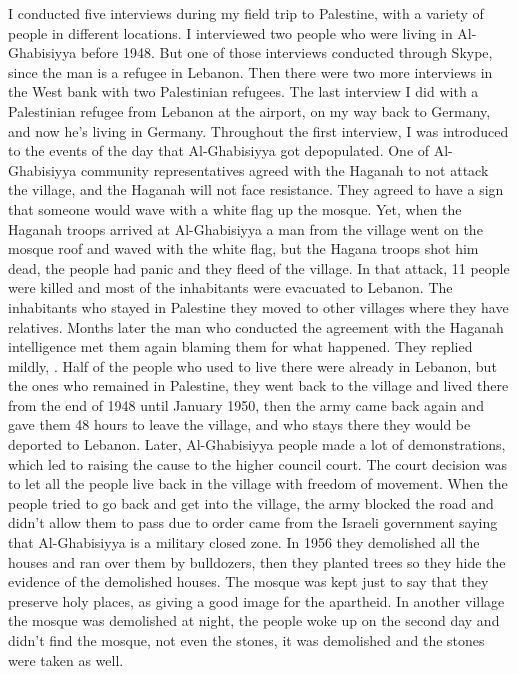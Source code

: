 I conducted five interviews during my field trip to Palestine, with a variety of people in different locations. I interviewed two people who were living in Al-Ghabisiyya before 1948. But one of those interviews conducted through Skype, since the man is a refugee in Lebanon. Then there were two more interviews in the West bank with two Palestinian refugees. The last interview I did with a Palestinian refugee from Lebanon at the airport, on my way back to Germany, and now he's living in Germany. Throughout the first interview, I was introduced to the events of the day that Al-Ghabisiyya got depopulated. One of Al-Ghabisiyya community representatives agreed with the Haganah to not attack the village, and the Haganah will not face resistance. They agreed to have a sign that someone would wave with a white flag up the mosque. Yet, when the Haganah troops arrived at Al-Ghabisiyya a man from the village went on the mosque roof and waved with the white flag, but the Hagana troops shot him dead, the people had panic and they fleed of the village. In that attack, 11 people were killed and most of the inhabitants were evacuated to Lebanon. The inhabitants who stayed in Palestine they moved to other villages where they have relatives. Months later the man who conducted the agreement with the Haganah intelligence met them again blaming them for what happened. They replied mildly, . Half of the people who used to live there were already in Lebanon, but the ones who remained in Palestine, they went back to the village and lived there from the end of 1948 until January 1950, then the army came back again and gave them 48 hours to leave the village, and who stays there they would be deported to Lebanon. Later, Al-Ghabisiyya people made a lot of demonstrations, which led to raising the cause to the higher council court. The court decision was to let all the people live back in the village with freedom of movement. When the people tried to go back and get into the village, the army blocked the road and didn't allow them to pass due to order came from the Israeli government saying that Al-Ghabisiyya is a military closed zone. In 1956 they demolished all the houses and ran over them by bulldozers, then they planted trees so they hide the evidence of the demolished houses.  The mosque was kept just to say that they preserve holy places, as giving a good image for the apartheid. In another village the mosque was demolished at night, the people woke up on the second day and didn't find the mosque, not even the stones, it was demolished and the stones were taken as well. 


